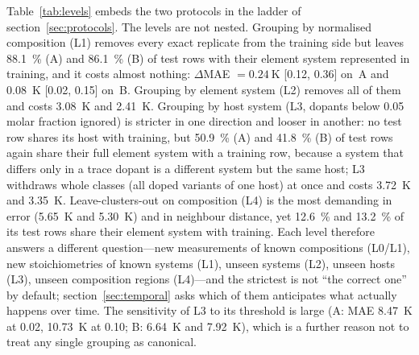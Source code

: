 \documentclass{iopjournal}
\newcommand{\ci}[2]{[\num{#1}, \num{#2}]}
\begin{document}
Table~\ref{tab:levels} embeds the two protocols in the ladder of section~\ref{sec:protocols}. The
levels are not nested. Grouping by normalised composition (L1) removes every exact replicate from
the training side but leaves \SI{88.1}{\percent} (A) and \SI{86.1}{\percent} (B) of test rows with
their element system represented in training, and it costs almost nothing:
$\Delta$MAE $=\SI{+0.24}{\kelvin}$ \ci{+0.12}{+0.36} on~A and \SI{+0.08}{\kelvin} \ci{+0.02}{+0.15}
on~B. Grouping by element system (L2) removes all of them and costs \SI{3.08}{\kelvin} and
\SI{2.41}{\kelvin}. Grouping by host system (L3, dopants below \num{0.05} molar fraction ignored)
is stricter in one direction and looser in another: no test row shares its host with training, but
\SI{50.9}{\percent} (A) and \SI{41.8}{\percent} (B) of test rows again share their full element
system with a training row, because a system that differs only in a trace dopant is a different
system but the same host; L3 withdraws whole classes (all doped variants of one host) at once and
costs \SI{3.72}{\kelvin} and \SI{3.35}{\kelvin}. Leave-clusters-out on composition (L4) is the
most demanding in error (\SI{+5.65}{\kelvin} and \SI{+5.30}{\kelvin}) and in neighbour distance,
yet \SI{12.6}{\percent} and \SI{13.2}{\percent} of its test rows share their element system with
training. Each level therefore answers a different question---new measurements of known
compositions (L0/L1), new stoichiometries of known systems (L1), unseen systems (L2), unseen hosts
(L3), unseen composition regions (L4)---and the strictest is not ``the correct one'' by default;
section~\ref{sec:temporal} asks which of them anticipates what actually happens over time. The
sensitivity of L3 to its threshold is large (A: MAE \SI{8.47}{\kelvin} at \num{0.02},
\SI{10.73}{\kelvin} at \num{0.10}; B: \SI{6.64}{\kelvin} and \SI{7.92}{\kelvin}), which is a
further reason not to treat any single grouping as canonical.
\end{document}
